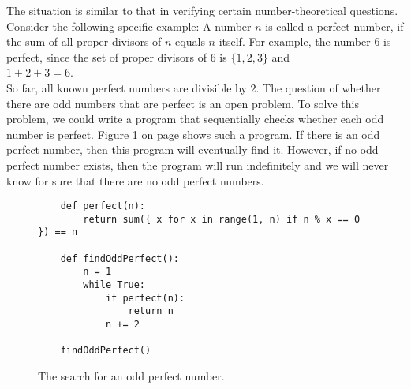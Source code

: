 The situation is similar to that in verifying certain number-theoretical
questions. Consider the following specific example: A number $n$ is called 
a \href{https://en.wikipedia.org/wiki/Perfect_number}{perfect number},
if the sum of all proper divisors of $n$ equals $n$ itself. For example, the number $6$ is perfect, since the set of proper divisors of $6$ is $\{1,2,3\}$ and 
\\[0.2cm]
\hspace*{1.3cm}
$1 + 2 + 3 = 6$.
\\[0.2cm]
So far, all known perfect numbers are divisible by $2$. The question of whether there are
odd numbers that are perfect is an open  problem. To solve this
problem, we could write a program that sequentially checks whether each
odd number is perfect. Figure \ref{fig:Find-Perfect.ipynb}
on page \pageref{fig:Find-Perfect.ipynb} shows such a program. If there is an odd perfect number,
then this program will eventually find it. However, if no
odd perfect number exists, then the program will run indefinitely and
we will never know for sure that there are no odd perfect numbers.

\begin{figure}[!ht]
  \centering
\begin{verbatim}
    def perfect(n):
        return sum({ x for x in range(1, n) if n % x == 0 }) == n
    
    def findOddPerfect():
        n = 1
        while True:
            if perfect(n):
                return n
            n += 2
    
    findOddPerfect()
\end{verbatim}
\vspace*{-0.3cm}
  \caption{The search for an odd perfect number.}
  \label{fig:Find-Perfect.ipynb}
\end{figure} 

